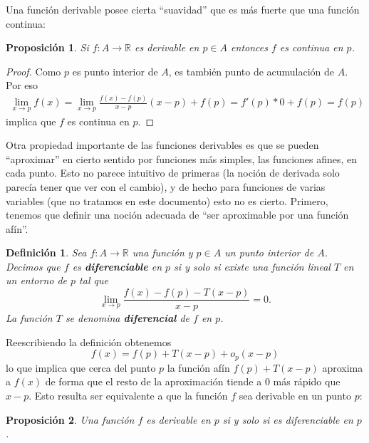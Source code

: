 \documentclass{article}
\newtheorem{prop}{Proposición}
\newtheorem{define}{Definición}
\newcommand{\reales}{\mathbb{R}}
\begin{document}
Una función derivable posee cierta ``suavidad'' que es más fuerte que una función continua:

\begin{prop}
	Si $f: A \rightarrow \reales$ es derivable en $p \in A$ entonces $f$ es continua en $p$.
\end{prop}

\begin{proof}
	Como $p$ es punto interior de $A$, es también punto de acumulación de $A$. Por eso
	\begin{align*}
		\lim_{x\rightarrow p} f(x) = \lim_{x\rightarrow p} \frac{f(x) - f(p)}{x - p} (x-p) + f(p) = f'(p)*0 + f(p) = f(p)
	\end{align*}
	implica que $f$ es continua en $p$.
\end{proof}

Otra propiedad importante de las funciones derivables es que se pueden ``aproximar'' en cierto sentido por funciones más simples, las funciones afines, en cada punto. Esto no parece intuitivo de primeras (la noción de derivada solo parecía tener que ver con el cambio), y de hecho para funciones de varias variables (que no tratamos en este documento) esto no es cierto. Primero, tenemos que definir una noción adecuada de ``ser aproximable por una función afín''.

\begin{define}
	Sea $f: A \rightarrow \reales$ una función y $p \in A$ un punto interior de $A$. Decimos que $f$ es \textbf{diferenciable} en $p$ si y solo si existe una función lineal $T$ en un entorno de $p$ tal que
	\begin{equation*}
		\lim_{x \rightarrow p} \frac{f(x) - f(p) - T(x-p)}{x-p} = 0.
	\end{equation*}
	La función $T$ se denomina \textbf{diferencial} de $f$ en $p$.
\end{define}

Reescribiendo la definición obtenemos
\begin{equation*}
	f(x) = f(p) + T(x-p) + o_p(x-p)
\end{equation*}
lo que implica que cerca del punto $p$ la función afín $f(p) + T(x-p)$ aproxima a $f(x)$ de forma que el resto de la aproximación tiende a $0$ más rápido que $x-p$. Esto resulta ser equivalente a que la función $f$ sea derivable en un punto $p$:

\begin{prop}
	Una función $f$ es derivable en $p$ si y solo si es diferenciable en $p$.
\end{prop}
\end{document}
